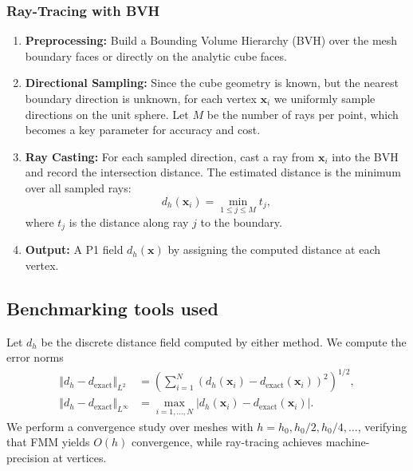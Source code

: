 \subsubsection{Ray-Tracing with BVH}
\begin{enumerate}
  \item \textbf{Preprocessing:} Build a Bounding Volume Hierarchy (BVH) over the mesh boundary faces or directly on the analytic cube faces.
  \item \textbf{Directional Sampling:} Since the cube geometry is known, but the nearest boundary direction is unknown, for each vertex $\mathbf{x}_i$ we uniformly sample directions on the unit sphere. Let $M$ be the number of rays per point, which becomes a key parameter for accuracy and cost.
  \item \textbf{Ray Casting:} For each sampled direction, cast a ray from $\mathbf{x}_i$ into the BVH and record the intersection distance. The estimated distance is the minimum over all sampled rays:
  \[ d_h(\mathbf{x}_i) = \min_{1\le j\le M} t_j, \]
  where $t_j$ is the distance along ray $j$ to the boundary.
  \item \textbf{Output:} A P1 field $d_h(\mathbf{x})$ by assigning the computed distance at each vertex.
\end{enumerate}





\subsection{Benchmarking tools used}

Let $d_h$ be the discrete distance field computed by either method. We compute the error norms
\begin{align}
  \Vert d_h - d_{\mathrm{exact}}\Vert_{L^2} &= \left( \sum_{i=1}^N (d_h(\mathbf{x}_i) - d_{\mathrm{exact}}(\mathbf{x}_i))^2
    \right)^{1/2},\\
  \Vert d_h - d_{\mathrm{exact}}\Vert_{L^\infty} &= \max_{i=1,\dots,N} |d_h(\mathbf{x}_i) - d_{\mathrm{exact}}(\mathbf{x}_i)|.
\end{align}
We perform a convergence study over meshes with $h = h_0, h_0/2, h_0/4, \dots$, verifying that FMM yields $O(h)$ convergence, while ray-tracing achieves machine-precision at vertices.






